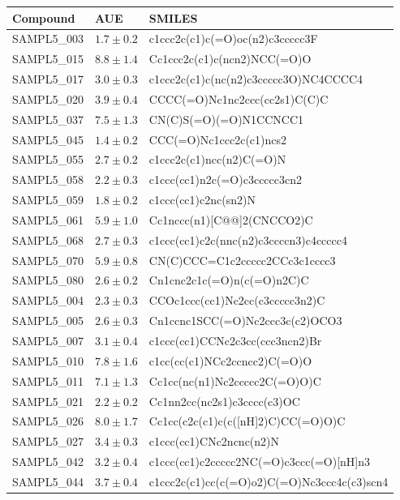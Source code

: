 \begin{tabular}{| p{2cm} | p{2cm} | p{10cm} |}
\hline
Compound & AUE & SMILES \\
\hline
SAMPL5\_003 & $ 1.7 \pm 0.2 $ & c1ccc2c(c1)c(=O)oc(n2)c3ccccc3F \\
SAMPL5\_015 & $ 8.8 \pm 1.4 $ & Cc1ccc2c(c1)c(ncn2)NCC(=O)O \\
SAMPL5\_017 & $ 3.0 \pm 0.3 $ & c1ccc2c(c1)c(nc(n2)c3ccccc3O)NC4CCCC4 \\
SAMPL5\_020 & $ 3.9 \pm 0.4 $ & CCCC(=O)Nc1nc2ccc(cc2s1)C(C)C \\
SAMPL5\_037 & $ 7.5 \pm 1.3 $ & CN(C)S(=O)(=O)N1CCNCC1 \\
SAMPL5\_045 & $ 1.4 \pm 0.2 $ & CCC(=O)Nc1ccc2c(c1)ncs2 \\
SAMPL5\_055 & $ 2.7 \pm 0.2 $ & c1ccc2c(c1)ncc(n2)C(=O)N \\
SAMPL5\_058 & $ 2.2 \pm 0.3 $ & c1ccc(cc1)n2c(=O)c3ccccc3cn2 \\
SAMPL5\_059 & $ 1.8 \pm 0.2 $ & c1ccc(cc1)c2nc(sn2)N \\
SAMPL5\_061 & $ 5.9 \pm 1.0 $ & Cc1nccc(n1){[}C@@{]}2(CNCCO2)C \\
SAMPL5\_068 & $ 2.7 \pm 0.3 $ & c1ccc(cc1)c2c(nnc(n2)c3ccccn3)c4ccccc4 \\
SAMPL5\_070 & $ 5.9 \pm 0.8 $ & CN(C)CCC=C1c2ccccc2CCc3c1cccc3 \\
SAMPL5\_080 & $ 2.6 \pm 0.2 $ & Cn1cnc2c1c(=O)n(c(=O)n2C)C \\
\hline
SAMPL5\_004 & $ 2.3 \pm 0.3 $ & CCOc1ccc(cc1)Nc2cc(c3ccccc3n2)C \\
SAMPL5\_005 & $ 2.6 \pm 0.3 $ & Cn1ccnc1SCC(=O)Nc2ccc3c(c2)OCO3 \\
SAMPL5\_007 & $ 3.1 \pm 0.4 $ & c1ccc(cc1)CCNc2c3cc(ccc3ncn2)Br \\
SAMPL5\_010 & $ 7.8 \pm 1.6 $ & c1cc(cc(c1)NCc2ccncc2)C(=O)O \\
SAMPL5\_011 & $ 7.1 \pm 1.3 $ & Cc1cc(nc(n1)Nc2ccccc2C(=O)O)C \\
SAMPL5\_021 & $ 2.2 \pm 0.2 $ & Cc1nn2cc(nc2s1)c3cccc(c3)OC \\
SAMPL5\_026 & $ 8.0 \pm 1.7 $ & Cc1cc(c2c(c1)c(c({[}nH{]}2)C)CC(=O)O)C \\
SAMPL5\_027 & $ 3.4 \pm 0.3 $ & c1ccc(cc1)CNc2ncnc(n2)N \\
SAMPL5\_042 & $ 3.2 \pm 0.4 $ & c1ccc(cc1)c2ccccc2NC(=O)c3ccc(=O){[}nH{]}n3 \\
SAMPL5\_044 & $ 3.7 \pm 0.4 $ & c1ccc2c(c1)cc(c(=O)o2)C(=O)Nc3ccc4c(c3)scn4 \\

\end{tabular}

